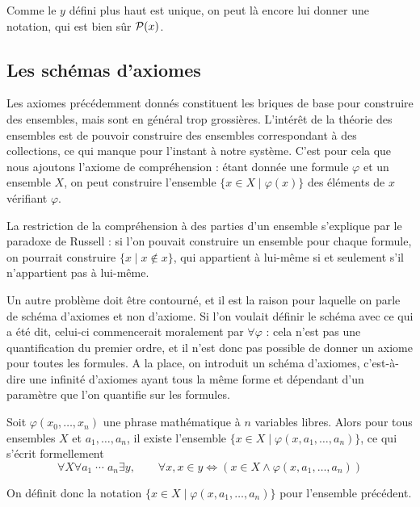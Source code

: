 \begin{notation}
  Comme le $y$ défini plus haut est unique, on peut là encore lui donner une
  notation, qui est bien sûr $\mathcal{P}(x)$.
\end{notation}

\subsection{Les schémas d'axiomes}

Les axiomes précédemment donnés constituent les briques de base pour construire
des ensembles, mais sont en général trop grossières. L'intérêt de la théorie des
ensembles est de pouvoir construire des ensembles correspondant à des
collections, ce qui manque pour l'instant à notre système. C'est pour cela que
nous ajoutons l'axiome de compréhension : étant donnée une formule $\varphi$ et
un ensemble $X$, on peut construire l'ensemble $\{x \in X\mid \varphi(x)\}$ des
éléments de $x$ vérifiant $\varphi$.

La restriction de la compréhension à des parties d'un ensemble s'explique par le
paradoxe de Russell : si l'on pouvait construire un ensemble pour chaque
formule, on pourrait construire $\{ x \mid x\notin x\}$, qui appartient à
lui-même si et seulement s'il n'appartient pas à lui-même.

Un autre problème doit être contourné, et il est la raison pour laquelle on parle
de schéma d'axiomes et non d'axiome. Si l'on voulait définir le schéma avec ce
qui a été dit, celui-ci commencerait moralement par $\forall \varphi$ : cela
n'est pas une quantification du premier ordre, et il n'est donc pas possible de
donner un axiome pour toutes les formules. A la place, on introduit un schéma
d'axiomes, c'est-à-dire une infinité d'axiomes ayant tous la même forme et
dépendant d'un paramètre que l'on quantifie sur les formules.

\begin{axiom}
  Soit $\varphi(x_0,\ldots,x_n)$ une phrase mathématique à $n$ variables libres.
  Alors pour tous ensembles $X$ et $a_1,\ldots,a_n$, il existe l'ensemble
  $\{x\in X \mid \varphi(x,a_1,\ldots,a_n)\}$, ce qui s'écrit formellement
  \[\forall X\forall a_1\;\cdots\;a_n\exists y,\qquad
    \forall x, x \in y \iff (x\in X\land \varphi(x,a_1,\ldots,a_n))\]
\end{axiom}

\begin{notation}
  On définit donc la notation $\{x\in X\mid \varphi(x,a_1,\ldots,a_n)\}$ pour
  l'ensemble précédent.
\end{notation}

